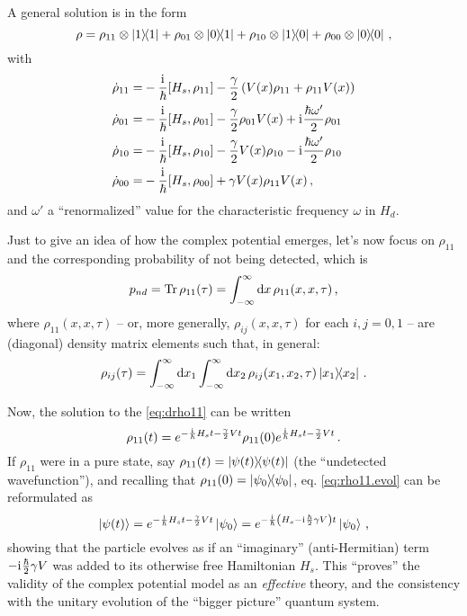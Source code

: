 A general solution is in the form
\begin{equation}
  \rho =
  \rho_{11} \otimes \ketbra{1}{1}
+ \rho_{01} \otimes \ketbra{0}{1}
+ \rho_{10} \otimes \ketbra{1}{0}
+ \rho_{00} \otimes \ketbra{0}{0}
\,\text{,}
\end{equation}
with
\begin{subequations}\begin{align}
  \dot{\rho}_{11} =& -\frac{\mathrm{i}\mkern1mu}{\hbar} [ H_s, \rho_{11} ] -\frac{\gamma}{2}\left(V(x)\rho_{11} + \rho_{11}V(x)\right) \label{eq:drho11} \\
  \dot{\rho}_{01} =& -\frac{\mathrm{i}\mkern1mu}{\hbar} [ H_s, \rho_{01} ] -\frac{\gamma}{2}\rho_{01}V(x) + \mathrm{i}\mkern1mu \frac{\hbar\omega'}{2} \rho_{01}\\
  \dot{\rho}_{10} =& -\frac{\mathrm{i}\mkern1mu}{\hbar} [ H_s, \rho_{10} ] -\frac{\gamma}{2}V(x)\rho_{10} - \mathrm{i}\mkern1mu \frac{\hbar\omega'}{2} \rho_{10}\\
  \dot{\rho}_{00} =& -\frac{\mathrm{i}\mkern1mu}{\hbar} [ H_s, \rho_{00} ] +\gamma V(x)\rho_{11}V(x) \,\text{,}
\end{align}\end{subequations}
and $\omega'$ a ``renormalized'' value for the characteristic frequency $\omega$ in $H_d$.

Just to give an idea of how the complex potential emerges, let's now focus on $\rho_{11}$
and the corresponding probability of not being detected, which is
\begin{equation}\label{eq:p_nd}
  p_{nd} = \Tr \rho_{11}(\tau) = \int_{-\infty}^{\infty} \dd{x} \rho_{11}(x, x, \tau) \,\text{,}
\end{equation}
where $\rho_{11}(x, x, \tau)$
-- or, more generally, $\rho_{ij}(x, x, \tau)$ for each $i, j = 0, 1$ --
are (diagonal) density matrix elements such that, in general:
\begin{equation}
  \rho_{ij}(\tau) = \int_{-\infty}^{\infty} \dd{x_1} \int_{-\infty}^{\infty} \dd{x_2} \rho_{ij}(x_1, x_2, \tau) \ketbra{x_1}{x_2}
  \, \text{.}
\end{equation}

Now, the solution to the \eqref{eq:drho11} can be written
\begin{equation}\label{eq:rho11.evol}
  \rho_{11}(t) =  e^{-\frac{\mathrm{i}\mkern1mu}{\hbar}H_{s}t-\frac{\gamma}{2}Vt}
  \rho_{11}(0)    e^{ \frac{\mathrm{i}\mkern1mu}{\hbar}H_{s}t-\frac{\gamma}{2}Vt} \, \text{.}
\end{equation}
If $\rho_{11}$ were in a pure state, say $\rho_{11}(t) = \ketbra{\psi(t)}$
(the ``undetected wavefunction''),
and recalling that $\rho_{11}(0) = \ketbra{\psi_0}$,
eq. \eqref{eq:rho11.evol} can be reformulated as
\begin{equation}
  \ket{\psi(t)} =
  e^{-\frac{\mathrm{i}\mkern1mu}{\hbar}H_{s}t-\frac{\gamma}{2}Vt} \ket{\psi_0} =
  e^{-\frac{\mathrm{i}\mkern1mu}{\hbar} \qty( H_{s} -\mathrm{i}\mkern1mu\frac{\hbar}{2}\gamma V ) t} \ket{\psi_0} \,\text{,}
\end{equation}
showing that the particle evolves as if an ``imaginary'' (anti-Hermitian) term
$-\mathrm{i}\mkern1mu\frac{\hbar}{2}\gamma V$ was added to its otherwise free Hamiltonian $H_s$.
This ``proves'' the validity of the complex potential model as an \emph{effective} theory,
and the consistency
with the unitary evolution of the ``bigger picture'' quantum system.

